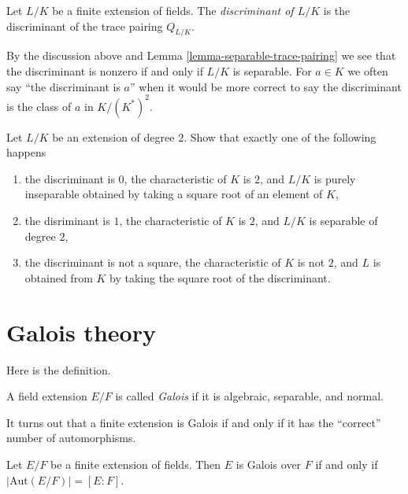 \begin{definition}
\label{definition-discriminant}
Let $L/K$ be a finite extension of fields. The
{\it discriminant of $L/K$} is the discriminant of
the trace pairing $Q_{L/K}$.
\end{definition}

\noindent
By the discussion above and Lemma \ref{lemma-separable-trace-pairing}
we see that the discriminant is nonzero if and only
if $L/K$ is separable. For $a \in K$ we often say
``the discriminant is $a$'' when it would be more correct
to say the discriminant is the class of $a$ in $K/(K^*)^2$.

\begin{exercise}
\label{exercise-quadratic-discriminant}
Let $L/K$ be an extension of degree $2$. Show that exactly
one of the following happens
\begin{enumerate}
\item the discriminant is $0$, the characteristic of $K$ is $2$,
and $L/K$ is purely inseparable obtained by taking a square root
of an element of $K$,
\item the disriminant is $1$, the characteristic of $K$ is $2$, and
$L/K$ is separable of degree $2$,
\item the discriminant is not a square, the characteristic of $K$
is not $2$, and $L$ is obtained from $K$ by taking the square root
of the discriminant.
\end{enumerate}
\end{exercise}











\section{Galois theory}
\label{section-galois-theory}

\noindent
Here is the definition.

\begin{definition}
\label{definition-galois}
A field extension $E/F$ is called {\it Galois} if it is algebraic,
separable, and normal.
\end{definition}

\noindent
It turns out that a finite extension is Galois if and only if it has
the ``correct'' number of automorphisms.

\begin{lemma}
\label{lemma-finite-Galois}
Let $E/F$ be a finite extension of fields. Then $E$ is Galois over $F$
if and only if $|\text{Aut}(E/F)| = [E : F]$.
\end{lemma}

